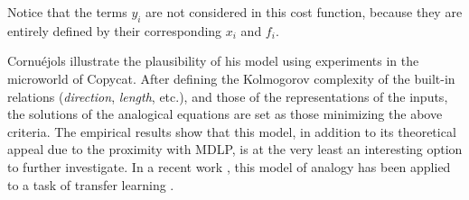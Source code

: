 Notice that the terms $y_i$ are not considered in this cost function, because
they are entirely defined by their corresponding $x_i$ and $f_i$.

Cornuéjols illustrate the plausibility of his model using experiments in the
microworld of Copycat. After defining the Kolmogorov complexity of the built-in
relations (\textit{direction}, \textit{length}, etc.), and those of the
representations of the inputs, the solutions of the analogical equations are
set as those minimizing the above criteria. The empirical results show that
this model, in addition to its theoretical appeal due to the proximity with
MDLP, is at the very least an interesting option to further investigate. In a
recent work , this model of analogy has been applied to a task of transfer
learning \cite{CorMur16}.

